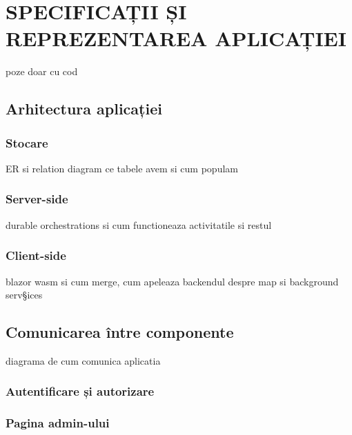\chapter{SPECIFICAȚII ȘI REPREZENTAREA APLICAȚIEI}
poze doar cu cod
\section{Arhitectura aplicației}
\subsection{Stocare}
ER si relation diagram
ce tabele avem si cum populam
\subsection{Server-side}
durable orchestrations si cum functioneaza activitatile si restul
\subsection{Client-side}
blazor wasm si cum merge, cum apeleaza backendul
despre map si background serv§ices
\section{Comunicarea între componente}
diagrama de cum comunica aplicatia
\subsection{Autentificare și autorizare}
\subsection{Pagina admin-ului}